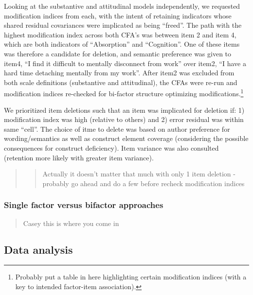 \documentclass[
  english,
  man]{apa6}
\begin{document}
Looking at the substantive and attitudinal models independently, we requested modification indices from each, with the intent of retaining indicators whose shared residual covariances were implicated as being \enquote{freed}. The path with the highest modification index across both CFA's was between item 2 and item 4, which are both indicators of \enquote{Absorption} and \enquote{Cognition}. One of these items was therefore a candidate for deletion, and semantic preference was given to item4, \enquote{I find it difficult to mentally disconnect from work} over item2, \enquote{I have a hard time detaching mentally from my work}. After item2 was excluded from both scale definitions (substantive and attitudinal), the CFAs were re-run and modification indices re-checked for bi-factor structure optimizing modifications.\footnote{Probably put a table in here highlighting certain modification indices (with a key to intended factor-item association).}

We prioritized item deletions such that an item was implicated for deletion if: 1) modification index was high (relative to others) and 2) error residual was within same \enquote{cell}. The choice of itme to delete was based on author preference for wording/semantics as well as construct element coverage (considering the possible consequences for construct deficiency). Item variance was also consulted (retention more likely with greater item variance).

\begin{quote}
\begin{quote}
Actually it doesn't matter that much with only 1 item deletion - probably go ahead and do a few before recheck modification indices
\end{quote}
\end{quote}

\hypertarget{single-factor-versus-bifactor-approaches}{%
\subsubsection{Single factor versus bifactor approaches}\label{single-factor-versus-bifactor-approaches}}

\begin{quote}
Casey this is where you come in
\end{quote}

\hypertarget{data-analysis}{%
\subsection{Data analysis}\label{data-analysis}}
\end{document}
